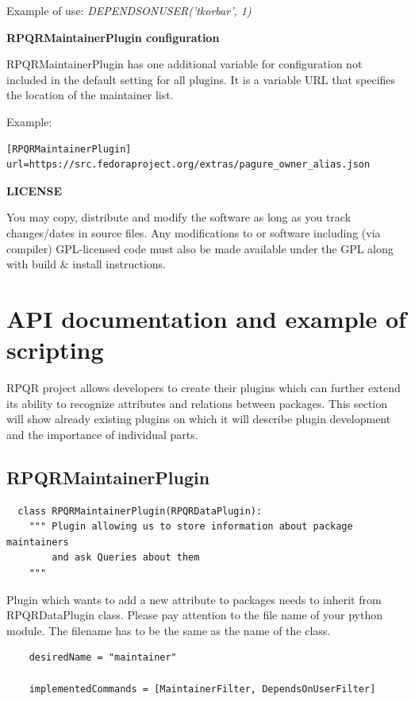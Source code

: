 Example of use: \textit{DEPENDSONUSER('tkorbar', 1)}

\textbf{RPQRMaintainerPlugin configuration}

RPQRMaintainerPlugin has one additional variable for configuration not included in the default setting for
all plugins. It is a variable URL that specifies the location of the maintainer list.

Example:
\begin{lstlisting}
[RPQRMaintainerPlugin]
url=https://src.fedoraproject.org/extras/pagure_owner_alias.json
\end{lstlisting}

\textbf{LICENSE}

You may copy, distribute and modify the software as long as you track changes/dates in source files.
Any modifications to or software including (via compiler) GPL-licensed code must also be made available
under the GPL along with build \& install instructions.

\section{API documentation and example of scripting}

RPQR project allows developers to create their plugins which can further extend its ability to
recognize attributes and relations between packages. This section will show already existing plugins
on which it will describe plugin development and the importance of individual parts.

\subsection*{RPQRMaintainerPlugin}

\begin{lstlisting}
  class RPQRMaintainerPlugin(RPQRDataPlugin):
    """ Plugin allowing us to store information about package maintainers
        and ask Queries about them
    """
\end{lstlisting}

Plugin which wants to add a new attribute to packages needs to inherit from RPQRDataPlugin class.
Please pay attention to the file name of your python module. The filename has to be the same as
the name of the class.

\begin{lstlisting}
    desiredName = "maintainer"

    implementedCommands = [MaintainerFilter, DependsOnUserFilter]
\end{lstlisting}

